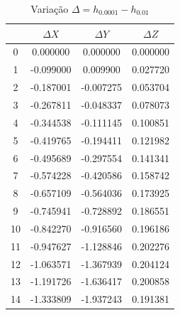 \documentclass[12pt, a4paper]{article}
\begin{document}
\begin{table}[H]
    \centering
    \footnotesize
    \begin{tabular}{|c|c|c|c|}
    \toprule
        & $\Delta X$ & $\Delta Y$ & $\Delta Z$ \\
    \midrule
    0 & 0.000000 & 0.000000 & 0.000000 \\
    1 & -0.099000 & 0.009900 & 0.027720 \\
    2 & -0.187001 & -0.007275 & 0.053704 \\
    3 & -0.267811 & -0.048337 & 0.078073 \\
    4 & -0.344538 & -0.111145 & 0.100851 \\
    5 & -0.419765 & -0.194411 & 0.121982 \\
    6 & -0.495689 & -0.297554 & 0.141341 \\
    7 & -0.574228 & -0.420586 & 0.158742 \\
    8 & -0.657109 & -0.564036 & 0.173925 \\
    9 & -0.745941 & -0.728892 & 0.186551 \\
    10 & -0.842270 & -0.916560 & 0.196186 \\
    11 & -0.947627 & -1.128846 & 0.202276 \\
    12 & -1.063571 & -1.367939 & 0.204124 \\
    13 & -1.191726 & -1.636417 & 0.200858 \\
    14 & -1.333809 & -1.937243 & 0.191381 \\
    \bottomrule
    \end{tabular}
    \caption{Variação $\Delta = h_{0.0001} - h_{0.01}$}
\end{table}
\end{document}
